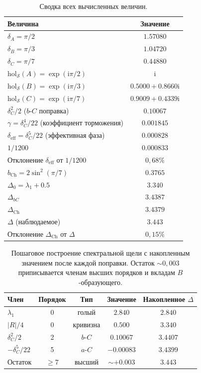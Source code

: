 \documentclass[12pt,a4paper]{article}
\theoremstyle{definition}
\theoremstyle{remark}
\newcommand{\hol}{\mathrm{hol}}
\newcommand{\cS}{\mathcal{S}}
\newcommand{\ii}{\mathrm{i}}
\begin{document}
\begin{table}[H]
\centering
\begin{tabular}{lc}
\toprule
\textbf{Величина} & \textbf{Значение} \\
\midrule
$\delta_A = \pi/2$ & $1.57080$ \\
$\delta_B = \pi/3$ & $1.04720$ \\
$\delta_C = \pi/7$ & $0.44880$ \\
$\hol_{\cS}(A) = \exp(\ii\pi/2)$ & $\ii$ \\
$\hol_{\cS}(B) = \exp(\ii\pi/3)$ & $0.5000 + 0.8660\ii$ \\
$\hol_{\cS}(C) = \exp(\ii\pi/7)$ & $0.9009 + 0.4339\ii$ \\
\midrule
$\delta_C^2/2$ ($b$-$C$ поправка) & $0.10067$ \\
$\gamma = \delta_C^4/22$ (коэффициент торможения) & $0.001845$ \\
$\delta_{\mathrm{eff}} = \delta_C^5/22$ (эффективная фаза) & $0.000828$ \\
$1/1200$ & $0.000833$ \\
Отклонение $\delta_{\mathrm{eff}}$ от $1/1200$ & $0{,}68\%$ \\
\midrule
$b_{\mathrm{Ch}} = 2\sin^2(\pi/7)$ & $0.3765$ \\
\midrule
$\Delta_0 = \lambda_1 + 0.5$ & $3.340$ \\
$\Delta_{bC}$ & $3.4387$ \\
$\Delta_{\mathrm{Ch}}$ & $3.4379$ \\
$\Delta$ (наблюдаемое) & $3.443$ \\
Отклонение $\Delta_{\mathrm{Ch}}$ от $\Delta$ & $0{,}15\%$ \\
\bottomrule
\end{tabular}
\caption{Сводка всех вычисленных величин.}
\label{tab:summary}
\end{table}

\begin{table}[H]
\centering
\begin{tabular}{lcccc}
\toprule
\textbf{Член} & \textbf{Порядок} & \textbf{Тип} & \textbf{Значение} & \textbf{Накопленное $\Delta$} \\
\midrule
$\lambda_1$ & 0 & голый & $2.840$ & $2.840$ \\
$|R|/4$ & 0 & кривизна & $0.500$ & $3.340$ \\
$\delta_C^2/2$ & 2 & $b$-$C$ & $0.10067$ & $3.4407$ \\
$-\delta_C^5/22$ & 5 & $a$-$C$ & $-0.00083$ & $3.4399$ \\
\midrule
Остаток & $\geq 7$ & высший & $\sim +0.003$ & $3.443$ \\
\bottomrule
\end{tabular}
\caption{Пошаговое построение спектральной щели с накопленным значением после каждой поправки. Остаток $\sim 0{,}003$ приписывается членам высших порядков и вкладам $B$-образующего.}
\label{tab:step_by_step}
\end{table}
\end{document}
